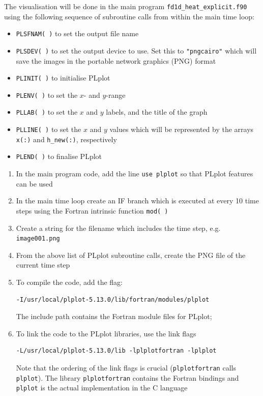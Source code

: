 \documentclass[12pt]{article}
\begin{document}
\begin{enumerate}
The visualisation will be done in the main program \texttt{fd1d\_heat\_explicit.f90} using the
following sequence of subroutine calls from within the main time loop:
\begin{itemize}
\item\texttt{PLSFNAM( )} to set the output file name 
\item\texttt{PLSDEV( )} to set the output device to use. Set this to \texttt{"pngcairo"} which
will save the images in the portable network graphics (PNG) format
\item\texttt{PLINIT( )} to initialise PLplot
\item\texttt{PLENV( )} to set the $x$- and $y$-range
\item\texttt{PLLAB( )} to set the $x$ and $y$ labels, and the title of the graph
\item\texttt{PLLINE( )} to set the $x$ and $y$ values which will be represented by the
  arrays \texttt{x(:)} and \texttt{h\_new(:)}, respectively
\item\texttt{PLEND( )} to finalise PLplot
\end{itemize}  
\begin{enumerate}
\item In the main program code, add the line \texttt{use plplot} so that PLplot features can be
used
\item In the main time loop create an IF branch which is executed at every 10 time steps
using the Fortran intrinsic function \texttt{mod( )}
\item Create a string for the filename which includes the time step, e.g. 
\texttt{image001.png}
\item From the above list of PLplot subroutine calls, create the PNG file of the
current time step
\item To compile the code, add the flag:
\begin{verbatim}
-I/usr/local/plplot-5.13.0/lib/fortran/modules/plplot
\end{verbatim}
The include path contains the Fortran module files for PLplot;
\item To link the code to the PLplot libraries, use the link flags
\begin{verbatim}
-L/usr/local/plplot-5.13.0/lib -lplplotfortran -lplplot
\end{verbatim}
Note that the ordering of the link flags is crucial (\texttt{plplotfortran} calls \texttt{plplot}). The
library \texttt{plplotfortran} contains the Fortran bindings and \texttt{plplot} is the actual
implementation in the C language

\end{enumerate}
\end{enumerate}
\end{document}

